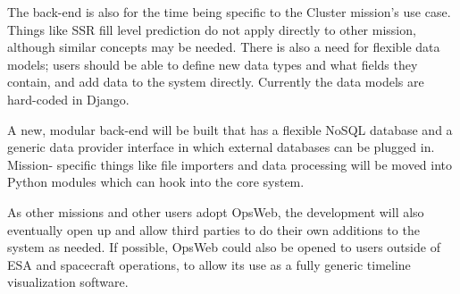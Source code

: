 The back-end is also for the time being specific to the Cluster mission's use case. Things like SSR fill level prediction do not apply directly to other mission, although similar concepts may be needed. There is also a need for flexible data models; users should be able to define new data types and what fields they contain, and add data to the system directly. Currently the data models are hard-coded in Django.

A new, modular back-end will be built that has a flexible NoSQL  database and a generic data provider interface in which external databases can be plugged in. Mission- specific things like file importers and data processing will be moved into Python modules which can hook into the core system.

As other missions and other users adopt OpsWeb, the development will also eventually open up and allow third parties to do their own additions to the system as needed. If possible, OpsWeb could also be opened to users outside of ESA and spacecraft operations, to allow its use as a fully generic timeline visualization software.